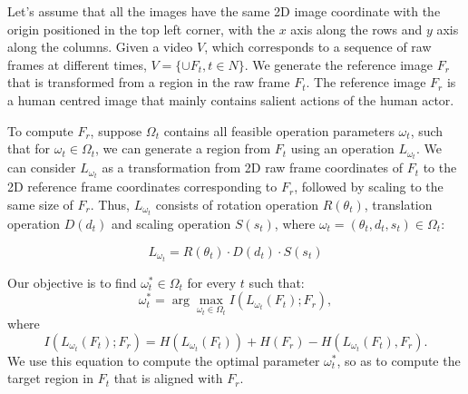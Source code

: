 \documentclass[10pt,twocolumn,letterpaper]{article}
\begin{document}
{Let's assume that all the images have the same 2D image coordinate with the origin positioned in the top left corner, with the $x$ axis along the rows and $y$ axis along the columns. Given a video $V$, which corresponds to a sequence of raw frames at different times, $V=\{\cup F_t, t\in N\}$. We generate the reference image $F_r$ that is transformed from a region in the raw frame $F_t$. The reference image $F_r$ is a human centred image that mainly contains salient actions of the human actor.


 To compute $F_r$, suppose $\Omega_t$ contains all feasible operation parameters $\omega_t$, such that for $\omega_t \in \Omega_t$, we can generate a region from $F_t$ using an operation $L_{\omega_t}$. We can consider $L_{\omega_t}$ as a transformation from 2D raw frame coordinates of $F_t$ to the 2D reference frame coordinates corresponding to $F_r$, followed by scaling to the same size of $F_r$. Thus, $L_{\omega_t}$ consists of rotation operation $R(\theta_t)$, translation operation $D(d_t)$ and scaling operation $S(s_t)$, where $\omega_t=(\theta_t,d_t,s_t) \in \Omega_t$: 

\begin{equation}
    L_{\omega_t} = R(\theta_t)\cdot D(d_t) \cdot S(s_t)
\end{equation}


\noindent Our objective is to find $\omega_t^*\in \Omega_t$ for every $t$ such that:
\begin{equation}
    \omega_t^* = \arg\max_{\omega_t\in \Omega_t} I(L_{\omega_t}(F_t);F_r),
\end{equation}
where
\begin{equation}
    I(L_{\omega_t}(F_t);F_r) = H(L_{\omega_t}(F_t)) + H(F_r)-H(L_{\omega_t}(F_t), F_r).
\end{equation}
We use this equation to compute the optimal parameter $\omega_t^*$, so as to compute the target region in $F_t$ that is aligned with $F_r$.

}
\end{document}
